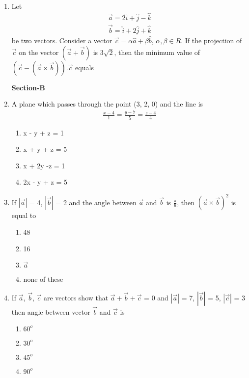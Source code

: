 \begin{enumerate}[label=\arabic*.,ref=\thesubsection.\theenumi]
\item Let 
\begin{align*}
\overrightarrow{a} = 2\hat{i} + \hat{j} - \hat{k}
\end{align*}
\begin{align*}
\overrightarrow{b} = \hat{i} + 2\hat{j} + \hat{k}
\end{align*}
be two vectors. Consider a vector $\overrightarrow{c} = \alpha\hat{a} + \beta\hat{b}$, $\alpha, \beta \in R$. If the projection of $\overrightarrow{c}$ on the vector $(\overrightarrow{a} + \overrightarrow{b})$ is 3$\sqrt{2}$, then the minimum value of $(\overrightarrow{c}-(\overrightarrow{a} \times \overrightarrow{b})).\overrightarrow{c}$ equals

\textbf{Section-B}

\item A plane which passes through the point (3, 2, 0) and the line is
\begin{align*}
\frac{x-4}{1} = \frac{y-7}{5} = \frac{z-4}{4}
\end{align*}
\begin{enumerate}
\item x - y + z = 1
\item x + y + z = 5
\item x + 2y -z = 1
\item 2x - y + z = 5
\end{enumerate}

\item If $|\overrightarrow{a}|$ = 4, $|\overrightarrow{b}|$ = 2 and the angle between $\overrightarrow{a}$ and $\overrightarrow{b}$ is $\frac{\pi}{6}$, then $(\overrightarrow{a} \times \overrightarrow{b})^{2}$ is equal to
\begin{enumerate}
\item 48
\item 16
\item $\overrightarrow{a}$
\item none of these
\end{enumerate}

\item If $\overrightarrow{a}$, $\overrightarrow{b}$, $\overrightarrow{c}$ are vectors show that $\overrightarrow{a} + \overrightarrow{b} + \overrightarrow{c}$ = 0 and $|\overrightarrow{a}|$ = 7, $|\overrightarrow{b}|$ = 5, 
$|\overrightarrow{c}|$ = 3 then angle between vector $\overrightarrow{b}$ and $\overrightarrow{c}$ is
\begin{enumerate}
\item $60^{o}$
\item $30^{o}$
\item $45^{o}$
\item $90^{o}$
\end{enumerate}


\end{enumerate}

